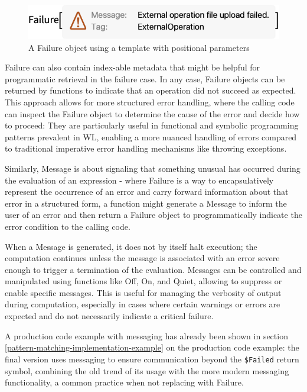 \begin{figure}[h]
    \centering
    \includegraphics[scale=0.5]{images/closing/O_6.png}
    \caption{A Failure object using a template with positional parameters \cite{noauthor_failurewolfram_nodate}}
    \label{fig:templated-failure}
\end{figure}

Failure can also contain index-able metadata that might be helpful for programmatic retrieval in the failure case. \cite{noauthor_failurewolfram_nodate} In any case, Failure objects can be returned by functions to indicate that an operation did not succeed as expected. This approach allows for more structured error handling, where the calling code can inspect the Failure object to determine the cause of the error and decide how to proceed: They are particularly useful in functional and symbolic programming patterns prevalent in WL, enabling a more nuanced handling of errors compared to traditional imperative error handling mechanisms like throwing exceptions.

Similarly, Message \cite{noauthor_messagewolfram_nodate} is about signaling that something unusual has occurred during the evaluation of an expression - where Failure is a way to encapsulatively represent the occurrence of an error and carry forward information about that error in a structured form, a function might generate a Message to inform the user of an error and then return a Failure object to programmatically indicate the error condition to the calling code.

When a Message is generated, it does not by itself halt execution; the computation continues unless the message is associated with an error severe enough to trigger a termination of the evaluation. \cite{noauthor_messagewolfram_nodate} Messages can be controlled and manipulated using functions like Off, On, and Quiet, allowing to suppress or enable specific messages. This is useful for managing the verbosity of output during computation, especially in cases where certain warnings or errors are expected and do not necessarily indicate a critical failure.

A production code example with messaging has already been shown in section \ref{pattern-matching-implementation-example} on the production code example: the final version uses messaging to ensure communication beyond the \lstinline+$Failed+ return symbol, combining the old trend of its usage with the more modern messaging functionality, a common practice when not replacing with Failure. 

